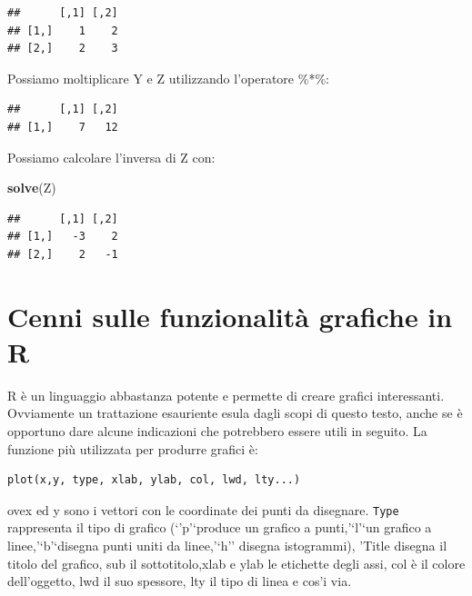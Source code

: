 \documentclass[a4paper,12pt,oneside]{book}
\newenvironment{Shaded}{\begin{snugshade}}{\end{snugshade}}
\newcommand{\KeywordTok}[1]{\textcolor[rgb]{0.13,0.29,0.53}{\textbf{#1}}}
\newcommand{\OperatorTok}[1]{\textcolor[rgb]{0.81,0.36,0.00}{\textbf{#1}}}
\newcommand{\NormalTok}[1]{#1}
\begin{document}
\begin{verbatim}
##      [,1] [,2]
## [1,]    1    2
## [2,]    2    3
\end{verbatim}

Possiamo moltiplicare Y e Z utilizzando l'operatore \%*\%:

\begin{Shaded}
\end{Shaded}

\begin{verbatim}
##      [,1] [,2]
## [1,]    7   12
\end{verbatim}

Possiamo calcolare l'inversa di Z con:

\begin{Shaded}
\begin{Highlighting}[]
\KeywordTok{solve}\NormalTok{(Z)}
\end{Highlighting}
\end{Shaded}

\begin{verbatim}
##      [,1] [,2]
## [1,]   -3    2
## [2,]    2   -1
\end{verbatim}

\section{Cenni sulle funzionalità grafiche in
R}\label{cenni-sulle-funzionalita-grafiche-in-r}

R è un linguaggio abbastanza potente e permette di creare grafici
interessanti. Ovviamente un trattazione esauriente esula dagli scopi di
questo testo, anche se è opportuno dare alcune indicazioni che
potrebbero essere utili in seguito. La funzione più utilizzata per
produrre grafici è:

\begin{verbatim}
plot(x,y, type, xlab, ylab, col, lwd, lty...)
\end{verbatim}

ovex ed y sono i vettori con le coordinate dei punti da disegnare.
\texttt{Type} rappresenta il tipo di grafico (`'p'`produce un grafico a
punti,'`l'`un grafico a linee,'`b'`disegna punti uniti da linee,'`h''
disegna istogrammi), 'Title disegna il titolo del grafico, sub il
sottotitolo,xlab e ylab le etichette degli assi, col è il colore
dell'oggetto, lwd il suo spessore, lty il tipo di linea e cos'i via.
\end{document}
